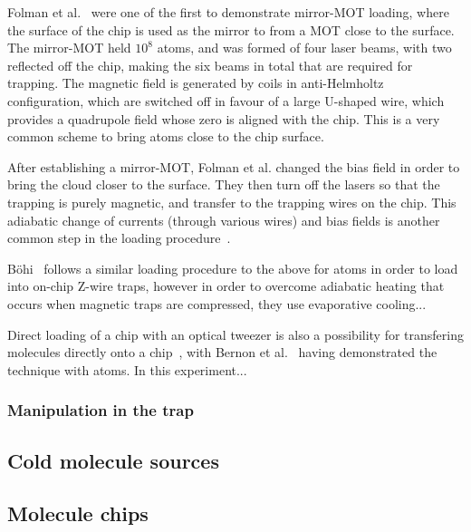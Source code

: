 Folman et al.~\cite{Folman2000} were one of the first to demonstrate mirror-MOT
loading, where the surface of the chip is used as the mirror to from a MOT close
to the surface. The mirror-MOT held $10^8$  atoms, and was formed of
four laser beams, with two reflected off the chip, making the six beams in total
that are required for trapping. The magnetic field is generated by coils in
anti-Helmholtz configuration, which are switched off in favour of a large
U-shaped wire, which provides a quadrupole field whose zero is aligned with the
chip. This is a very common scheme to bring atoms close to the chip
surface.~

After establishing a mirror-MOT, Folman et al. changed the bias field in order
to bring the cloud closer to the surface. They then turn off the lasers so that
the trapping is purely magnetic, and transfer to the trapping
wires on the chip. This adiabatic change of currents (through various wires) and
bias fields is another common step in the loading procedure~.


B\"ohi~\cite{rohtua} follows a similar loading procedure to the above for
 atoms in order to load into on-chip Z-wire traps, however in order
to overcome adiabatic heating %
that occurs when magnetic traps are compressed, they use evaporative cooling...

Direct loading of a chip with an optical tweezer is also a possibility for
transfering molecules directly onto a chip~\cite{Liueaar7797}, with Bernon et
al.~\cite{Bernon2013} having demonstrated the technique with atoms. In this
experiment...


\subsubsection{Manipulation in the trap}


\subsection{Cold molecule sources}

\subsection{Molecule chips}

